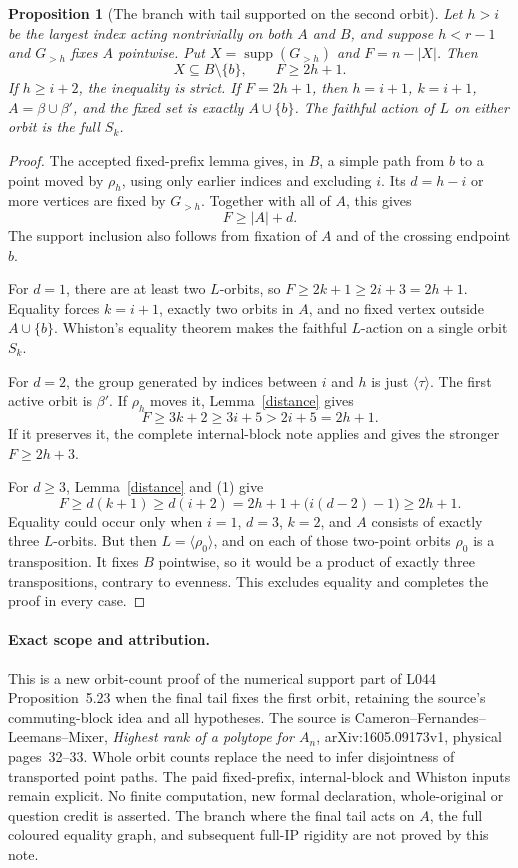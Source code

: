 \documentclass[11pt,a4paper]{article}
\newtheorem{proposition}[lemma]{Proposition}
\newcommand{\gen}[1]{\langle#1\rangle}
\begin{document}
\begin{proposition}[The branch with tail supported on the second orbit]
Let $h>i$ be the largest index acting nontrivially on both
$A$ and $B$, and suppose $h<r-1$ and $G_{>h}$ fixes $A$
pointwise. Put $X=\operatorname{supp}(G_{>h})$ and
$F=n-|X|$. Then
\[
                     X\subseteq B\setminus\{b\},\qquad F\geq2h+1.
\]
If $h\geq i+2$, the inequality is strict. If $F=2h+1$,
then $h=i+1$, $k=i+1$, $A=\beta\cup\beta'$, and the fixed
set is exactly $A\cup\{b\}$. The faithful action of $L$
on either orbit is the full $S_k$.
\end{proposition}
\begin{proof}
The accepted fixed-prefix lemma gives, in $B$, a simple path
from $b$ to a point moved by $\rho_h$, using only earlier
indices and excluding $i$. Its $d=h-i$ or more vertices
are fixed by $G_{>h}$. Together with all of $A$, this gives
\[
                              F\geq |A|+d.               \tag{1}
\]
The support inclusion also follows from fixation of $A$
and of the crossing endpoint $b$.

For $d=1$, there are at least two $L$-orbits, so
$F\geq2k+1\geq2i+3=2h+1$. Equality forces
$k=i+1$, exactly two orbits in $A$, and no fixed vertex
outside $A\cup\{b\}$. Whiston's equality theorem makes
the faithful $L$-action on a single orbit $S_k$.

For $d=2$, the group generated by indices between $i$ and
$h$ is just $\gen\tau$. The first active orbit is $\beta'$.
If $\rho_h$ moves it, Lemma~\ref{distance} gives
\[
                       F\geq3k+2\geq3i+5>2i+5=2h+1.
\]
If it preserves it, the complete internal-block note
applies and gives the stronger $F\geq2h+3$.

For $d\geq3$, Lemma~\ref{distance} and (1) give
\[
 F\geq d(k+1)\geq d(i+2)
      =2h+1+\bigl(i(d-2)-1\bigr)\geq2h+1.
\]
Equality could occur only when $i=1$, $d=3$, $k=2$,
and $A$ consists of exactly three $L$-orbits.
But then $L=\gen{\rho_0}$, and on each of those two-point
orbits $\rho_0$ is a transposition. It fixes $B$ pointwise,
so it would be a product of exactly three transpositions,
contrary to evenness. This excludes equality and completes
the proof in every case.
\end{proof}

\paragraph{Exact scope and attribution.}
This is a new orbit-count proof of the numerical support
part of L044 Proposition~5.23 when the final tail fixes the
first orbit, retaining the source's commuting-block idea
and all hypotheses. The source is Cameron--Fernandes--Leemans--Mixer,
\emph{Highest rank of a polytope for $A_n$}, arXiv:1605.09173v1,
physical pages~32--33. Whole orbit counts replace the need
to infer disjointness of transported point paths. The paid
fixed-prefix, internal-block and Whiston inputs remain
explicit. No finite computation, new formal declaration,
whole-original or question credit is asserted.
The branch where the final tail acts on $A$, the full
coloured equality graph, and subsequent full-IP rigidity
are not proved by this note.
\end{document}
